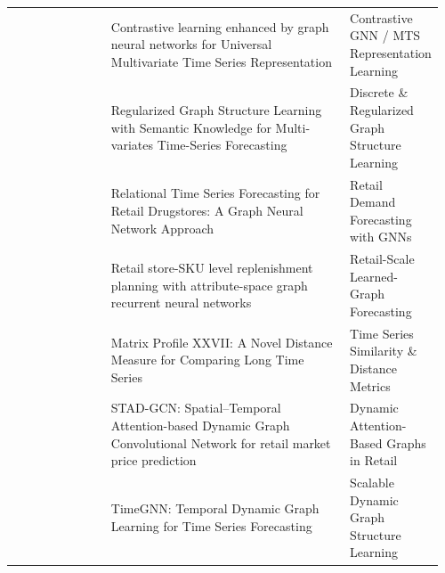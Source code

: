 \begin{longtable}{@{}L{0.23\linewidth} L{0.57\linewidth} L{0.16\linewidth}@{}}
~\parencite{WANG2024102429} & Contrastive learning enhanced by graph neural networks for Universal Multivariate Time Series Representation & Contrastive GNN / MTS Representation Learning\\
~\parencite{Yu20222362} & Regularized Graph Structure Learning with Semantic Knowledge for Multi-variates Time-Series Forecasting & Discrete \& Regularized Graph Structure Learning\\
~\parencite{liu_relational_2021} & Relational Time Series Forecasting for Retail Drugstores: A Graph Neural Network Approach & Retail Demand Forecasting with GNNs\\
~\parencite{MA2024123727} & Retail store-SKU level replenishment planning with attribute-space graph recurrent neural networks & Retail-Scale Learned-Graph Forecasting\\
~\parencite{der_matrix_2022} & Matrix Profile XXVII: A Novel Distance Measure for Comparing Long Time Series & Time Series Similarity \& Distance Metrics\\
~\parencite{kim2024stadgcn} & STAD-GCN: Spatial–Temporal Attention-based Dynamic Graph Convolutional Network for retail market price prediction & Dynamic Attention-Based Graphs in Retail\\
~\parencite{xu2024timegnn} & TimeGNN: Temporal Dynamic Graph Learning for Time Series Forecasting & Scalable Dynamic Graph Structure Learning\\
\end{longtable}
\endgroup




